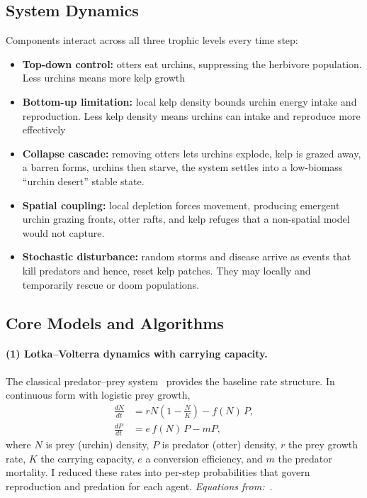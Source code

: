 \documentclass[manuscript,nonacm,11pt]{acmart}
\begin{document}
\subsection{System Dynamics}
Components interact across all three trophic levels every time step:
\begin{itemize}
  \item \textbf{Top-down control:} otters eat urchins, suppressing the
        herbivore population. Less urchins means more kelp growth
  \item \textbf{Bottom-up limitation:} local kelp density bounds urchin energy
        intake and reproduction. Less kelp density means urchins can intake and reproduce more effectively
  \item \textbf{Collapse cascade:} removing otters lets urchins explode, kelp is
        grazed away, a barren forms, urchins then starve, the system settles
        into a low-biomass ``urchin desert'' stable state.
  \item \textbf{Spatial coupling:} local depletion forces movement, producing
        emergent urchin grazing fronts, otter rafts, and kelp refuges that a
        non-spatial model would not capture.
  \item \textbf{Stochastic disturbance:} random storms and disease arrive as
        events that kill predators and hence, reset kelp patches. They may locally and temporarily 
        rescue or doom populations.
\end{itemize}

\subsection{Core Models and Algorithms}
\label{sec:models}

\paragraph{(1) Lotka--Volterra dynamics with carrying capacity.}
The classical predator--prey system~\cite{lotka1925,volterra1926} provides the
baseline rate structure. In continuous form with logistic prey growth,
\begin{align}
  \frac{dN}{dt} &= rN\!\left(1-\frac{N}{K}\right) - f(N)\,P, \\
  \frac{dP}{dt} &= e\,f(N)\,P - mP,
\end{align}
where $N$ is prey (urchin) density, $P$ is predator (otter) density, $r$ the
prey growth rate, $K$ the carrying capacity, $e$ a conversion efficiency, and
$m$ the predator mortality. I reduced these rates into per-step
probabilities that govern reproduction and predation for each agent.
\textit{Equations from:}~\cite{lotka1925, volterra1926}.
\end{document}
